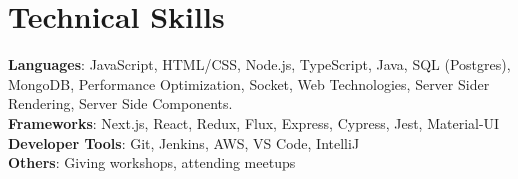 \documentclass[letterpaper,11pt]{article}
\begin{document}
\section{Technical Skills}
 \begin{itemize}[leftmargin=0.15in, label={}]
    \small{\item{
     \textbf{Languages}{: JavaScript, HTML/CSS, Node.js, TypeScript, Java, SQL (Postgres), MongoDB, Performance Optimization, Socket, Web Technologies, Server Sider Rendering, Server Side Components.} \\
     \textbf{Frameworks}{: Next.js, React, Redux, Flux, Express, Cypress, Jest, Material-UI} \\
     \textbf{Developer Tools}{: Git, Jenkins, AWS, VS Code, IntelliJ} \\
     \textbf{Others}{: Giving workshops, attending meetups} \\
    }}
 \end{itemize}


\end{document}
